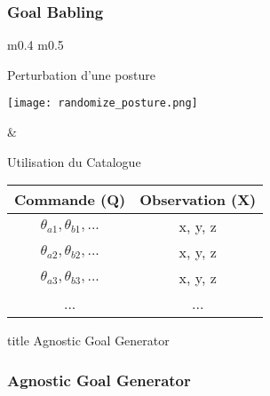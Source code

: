 \documentclass[french]{beamer}
\begin{document}

\begin{frame}
    \frametitle{Goal Babling}

    \begin{tabular}{m{} m{}}

        {\center Perturbation d'une posture}

        \texttt{[image: randomize\_posture.png]}

        \vspace{15mm}

        \phantom{}

        &

        \phantom{}
        
        \vspace{15mm}

        {\hspace{5mm} Utilisation du Catalogue}

        \begin{tabular}{||c | c ||}
            \hline
            Commande (Q) & Observation (X) \\
            \hline
            $\theta_{a1}, \theta_{b1}, ...$ & x, y, z\\
            $\theta_{a2}, \theta_{b2}, ...$ & x, y, z\\
            $\theta_{a3}, \theta_{b3}, ...$ & x, y, z\\
            ... & ...\\
            \hline
        \end{tabular}
        
    \end{tabular}

\end{frame}


\begin{frame}
    \vfill
    \centering
    \begin{beamercolorbox}[sep=8pt,center,shadow=true,rounded=true]{title}
        Agnostic Goal Generator\par
    \end{beamercolorbox}
    \vfill
\end{frame}


\begin{frame}
    \frametitle{Agnostic Goal Generator}

    \center

\end{frame}
\end{document}
